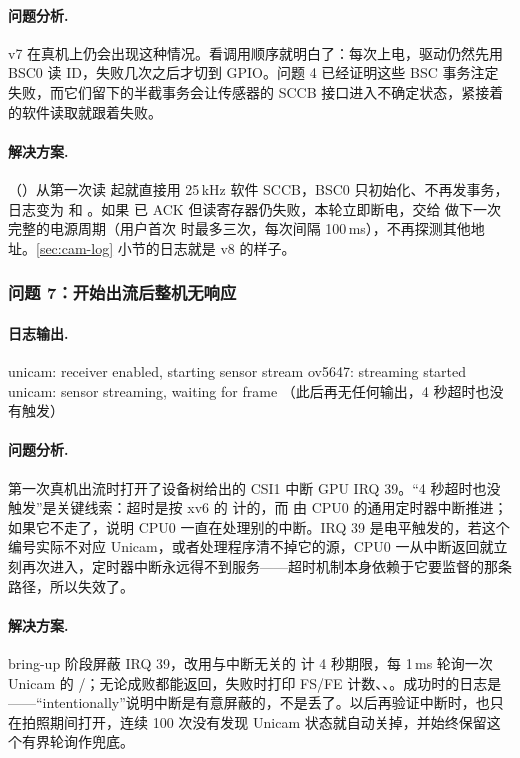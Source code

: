 \paragraph{问题分析.} v7 在真机上仍会出现这种情况。看调用顺序就明白了：每次上电，驱动仍然先用 BSC0 读 ID，失败几次之后才切到 GPIO。问题 4 已经证明这些 BSC 事务注定失败，而它们留下的半截事务会让传感器的 SCCB 接口进入不确定状态，紧接着的软件读取就跟着失败。

\paragraph{解决方案.}（）从第一次读  起就直接用 25\,kHz 软件 SCCB，BSC0 只初始化、不再发事务，日志变为  和 。如果  已 ACK 但读寄存器仍失败，本轮立即断电，交给  做下一次完整的电源周期（用户首次  时最多三次，每次间隔 100\,ms），不再探测其他地址。\ref{sec:cam-log} 小节的日志就是 v8 的样子。

\subsubsection{问题 7：开始出流后整机无响应}

\paragraph{日志输出.}
\begin{txtcode}
unicam: receiver enabled, starting sensor stream
ov5647: streaming started
unicam: sensor streaming, waiting for frame
（此后再无任何输出，4 秒超时也没有触发）
\end{txtcode}

\paragraph{问题分析.} 第一次真机出流时打开了设备树给出的 CSI1 中断 GPU IRQ 39。“4 秒超时也没触发”是关键线索：超时是按 xv6 的  计的，而  由 CPU0 的通用定时器中断推进；如果它不走了，说明 CPU0 一直在处理别的中断。IRQ 39 是电平触发的，若这个编号实际不对应 Unicam，或者处理程序清不掉它的源，CPU0 一从中断返回就立刻再次进入，定时器中断永远得不到服务——超时机制本身依赖于它要监督的那条路径，所以失效了。

\paragraph{解决方案.} bring-up 阶段屏蔽 IRQ 39，改用与中断无关的  计 4 秒期限，每 1\,ms 轮询一次 Unicam 的 /；无论成败都能返回，失败时打印 FS/FE 计数、、。成功时的日志是 ——“intentionally”说明中断是有意屏蔽的，不是丢了。以后再验证中断时，也只在拍照期间打开，连续 100 次没有发现 Unicam 状态就自动关掉，并始终保留这个有界轮询作兜底。

